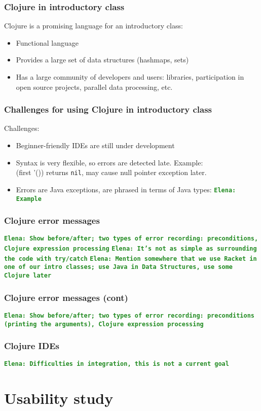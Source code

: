 \documentclass{beamer}
\newcommand{\comment}[1]{{\bf \tt  {#1}}}
\newcommand{\emcomment}[1]{\textcolor{ForestGreen}{\comment{Elena: {#1}}}}
\begin{document}
\begin{frame}
\frametitle{Clojure in introductory class}
Clojure is a promising language for an introductory class:
\begin{itemize}
\item Functional language
\item Provides a large set of data structures (hashmaps, sets)
 \item Has a large community of developers and users: libraries, participation in open source projects, parallel data processing,  etc. 
\end{itemize} 
\end{frame}

\begin{frame}
\frametitle{Challenges for using Clojure in introductory class}
Challenges:
\begin{itemize}
\item Beginner-friendly IDEs are still under development
\item Syntax is very flexible, so errors are detected late. Example: \\ 
{(first '())} returns {\tt nil}, may cause null pointer exception later.  
\item Errors are Java exceptions, are phrased in terms of Java types:
\emcomment{Example}
\end{itemize}
\end{frame}

\begin{frame}
\frametitle{ Clojure error messages}
\emcomment{Show before/after; two types of error recording: preconditions, Clojure expression processing}
\emcomment{It's not as simple as surrounding the code with try/catch}
\emcomment{Mention somewhere that we use Racket in one of our intro classes; use Java in Data Structures, use some Clojure later}
\end{frame}

\begin{frame}
\frametitle{ Clojure error messages (cont)}
\emcomment{Show before/after; two types of error recording: preconditions (printing the arguments), Clojure expression processing}
\end{frame}

\begin{frame}
\frametitle{ Clojure IDEs}
\emcomment{Difficulties in integration, this is not a current goal}
\end{frame}

\section{Usability study}
\end{document}
